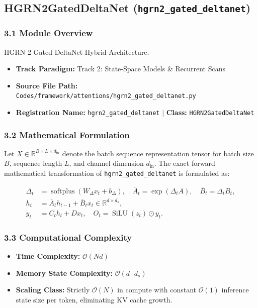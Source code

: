\subsection{HGRN2GatedDeltaNet (\texttt{hgrn2\_gated\_deltanet})}
\label{sec:app_module_hgrn2_gated_deltanet}

\subsubsection*{3.1 Module Overview}
HGRN-2 Gated DeltaNet Hybrid Architecture.
\begin{itemize}
    \item \textbf{Track Paradigm:} Track 2: State-Space Models \& Recurrent Scans
    \item \textbf{Source File Path:} \texttt{Codes/framework/attentions/hgrn2\_gated\_deltanet.py}
    \item \textbf{Registration Name:} \texttt{hgrn2\_gated\_deltanet} $\mid$ \textbf{Class:} \texttt{HGRN2GatedDeltaNet}
\end{itemize}

\subsubsection*{3.2 Mathematical Formulation}
Let $X \in \mathbb{R}^{B \times L \times d_{\text{in}}}$ denote the batch sequence representation tensor for batch size $B$, sequence length $L$, and channel dimension $d_{\text{in}}$. The exact forward mathematical transformation of \texttt{hgrn2\_gated\_deltanet} is formulated as:

\begin{align}
\Delta_t &= \operatorname{softplus}(W_\Delta x_t + b_\Delta), \quad \bar{A}_t = \exp(\Delta_t A), \quad \bar{B}_t = \Delta_t B_t, \\
h_t &= \bar{A}_t h_{t-1} + \bar{B}_t x_t \in \mathbb{R}^{d \times d_s}, \\
y_t &= C_t h_t + D x_t, \quad O_t = \operatorname{SiLU}(z_t) \odot y_t.
\end{align}


\subsubsection*{3.3 Computational Complexity}
\begin{itemize}
    \item \textbf{Time Complexity:} $\mathcal{O}(N d)$
    \item \textbf{Memory State Complexity:} $\mathcal{O}(d \cdot d_s)$
    \item \textbf{Scaling Class:} Strictly $\mathcal{O}(N)$ in compute with constant $\mathcal{O}(1)$ inference state size per token, eliminating KV cache growth.
\end{itemize}

